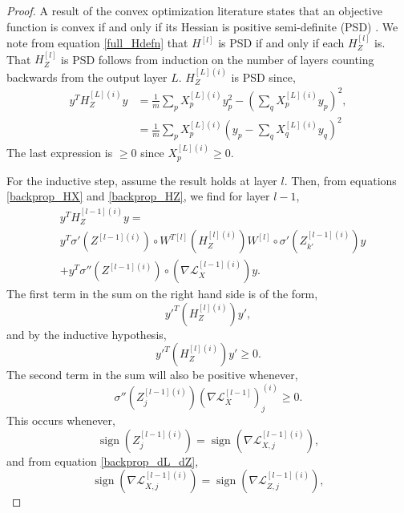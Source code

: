 \documentclass[nohyperref]{article}
\theoremstyle{plain}
\theoremstyle{definition}
\theoremstyle{remark}
\DeclareMathOperator*{\sgn}{sign}
\begin{document}
\begin{proof} 
A result of the convex optimization literature states that an objective function is convex if and only if its Hessian is positive semi-definite (PSD) \citep[see][page 71]{Boyd:Vanden} . We note from equation \ref{full_Hdefn} that $H^{[l]}$ is PSD if and only if each $H_Z^{[l]}$ is. That $H_Z^{[l]}$ is PSD follows from induction on the number of layers counting backwards from the output layer $L$.
$H_{Z}^{[L](i)}$ is PSD since,
\begin{align}
y^T H_{Z}^{[L](i)}y&=\frac{1}{m} \sum_p  X^{[L](i)}_p y_p^2 -(\sum_q X^{[L](i)}_p y_p)^2,\nonumber\\
&=\frac{1}{m} \sum_p X^{[L](i)}_p(y_p-\sum_q X^{[L](i)}_q y_q)^2
\end{align}
The last expression is $\ge 0$ since $X^{[L](i)}_p \ge 0$.

For the inductive step, assume the result holds at layer $l$. Then, from equations \ref{backprop_HX} and \ref{backprop_HZ}, we find for layer $l-1$,
\begin{align} 
 &y^T H_{Z}^{[l-1](i)}y=\nonumber\\
 &y^T \sigma'{(Z^{[l-1](i)})}\circ W^{T[l]} (H_Z^{[l](i)})W^{[l]}\circ \sigma'{(Z_{k'}^{[l-1](i)})} y\nonumber\\
 &+y^{T}\sigma''{(Z^{[l-1](i)})}\circ \left(\nabla \mathcal{L}^{[l-1](i)}_{X}\right) y.
 \end{align}
The first term in the sum on the right hand side is of the form,
\begin{equation}
 y'^T  (H_Z^{[l](i)}) y',
 \end{equation}
and by the inductive hypothesis,
\begin{equation}
 y'^T  (H_Z^{[l](i)}) y' \ge 0.
 \end{equation} 
 The second term in the sum will also be positive whenever,
\begin{equation}
\sigma''{(Z_j^{[l-1](i)})} \left(\nabla \mathcal{L}^{[l-1]}_{X}\right)_j^{(i)}\ge 0.
\end{equation}
This occurs whenever,
\begin{equation}
\sgn{\left(Z_j^{[l-1](i)}\right)}= \sgn{\left(\nabla \mathcal{L}^{[l-1](i)}_{X,j} \right)},
\end{equation} 
and from equation \ref{backprop_dL_dZ}, 
\begin{equation}
\sgn{\left(\nabla \mathcal{L}^{[l-1](i)}_{X,j}\right)}= \sgn{\left(\nabla \mathcal{L}^{[l-1](i)}_{Z,j} \right)},
\end{equation}  
\end{proof}
\end{document}
